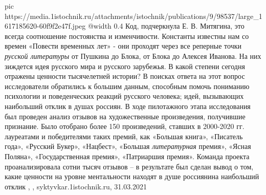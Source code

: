 \ifcmt
  pic https://media.1istochnik.ru/attachments/istochnik/publications/9/98537/large_1617185620-60f9f2e47f.jpeg
  @width 0.4
\fi
Код, подчеркнула Е. В. Митягина, это всегда соотношение постоянства и
изменчивости. Константы известны нам со времен «Повести временных лет» - они
проходят через все реперные точки \emph{русской литературы} от Пушкина до Блока, от
Блока до Алексея Иванова. На них зиждется идея русского мира и русского
зарубежья.  В какой степени сегодня отражены ценности тысячелетней истории? В
поисках ответа на этот вопрос исследователи обратились к большим данным,
способным помочь пониманию психологии и поведенческих реакций русского
человека; идей, вызывающих наибольший отклик в душах россиян. 
В ходе пилотажного этапа исследования был проведен анализ отзывов на
художественные произведения, получившие признание. Было отобрано более 150
произведений, ставших в 2000-2020 гг. лауреатами и победителями таких премий,
как «Большая книга», «Писатель года», «Русский Букер», «Нацбест», «Большая
\emph{литературная} премия», «Ясная Поляна», «Государственная премия», «Патриаршия
премия». Команда проекта проанализировала сотни тысяч отзывов – в результате
был сделан вывод о том, какие ценности на уровне ментальности находят в душе
россиянина наибольший отклик
, 
, syktyvkar.1istochnik.ru, 31.03.2021

